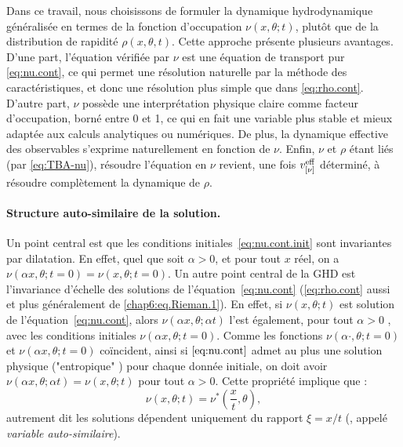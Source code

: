 Dans ce travail, nous choisissons de formuler la dynamique hydrodynamique généralisée en termes de la fonction d’occupation $\nu(x,\theta;t)$, plutôt que de la distribution de rapidité $\rho(x,\theta,t)$. Cette approche présente plusieurs avantages. D’une part, l’équation vérifiée par $\nu$ est une équation de transport pur \eqref{eq:nu.cont}, ce qui permet une résolution naturelle par la méthode des caractéristiques, et donc une résolution plus simple que dans \eqref{eq:rho.cont}. D’autre part, $\nu$ possède une interprétation physique claire comme facteur d'occupation, borné entre 0 et 1, ce qui en fait une variable plus stable et mieux adaptée aux calculs analytiques ou numériques.
De plus, la dynamique effective des observables s’exprime naturellement en fonction de $\nu$.
Enfin, $\nu$ et $\rho$ étant liés (par \eqref{eq:TBA-nu}), résoudre l’équation en $\nu$ revient, une fois $v^{\rm eff}_{[\nu]}$ déterminé, à résoudre complètement la dynamique de $\rho$.


\paragraph{Structure auto-similaire de la solution.}
Un point central est que les conditions initiales~\eqref{eq:nu.cont.init} sont invariantes par dilatation. En effet, quel que soit $\alpha >0$, et pour tout $x$ réel, on a $\nu(\alpha x , \theta ; t = 0 ) = \nu( x , \theta ; t = 0 ) $.
Un autre point central de la \gls{GHD} est l’invariance d’échelle des solutions de l’équation~\eqref{eq:nu.cont} (\eqref{eq:rho.cont} aussi et plus généralement de \eqref{chap6:eq.Rieman.1}). En effet, si $\nu(x,\theta;t)$ est solution de  l’équation~\eqref{eq:nu.cont}, alors $\nu(\alpha x, \theta; \alpha t)$ l’est également,  pour tout $\alpha > 0$ , avec les conditions initiales $\nu(\alpha x , \theta ; t = 0 )$. Comme les fonctions $\nu(\alpha \cdot , \theta ; t = 0 )$ et $\nu( \alpha x , \theta ; t = 0 )$ coïncident, ainsi si $\eqref{eq:nu.cont}$ admet au plus une solution physique ("entropique" \cite{coulombel:cel-00616496}) pour chaque donnée initiale, on doit avoir $\nu( \alpha x , \theta ; \alpha t ) = \nu(  x , \theta ;  t )$ pour tout $\alpha > 0 $. Cette propriété implique que :
\begin{equation}
    \nu(x,\theta;t) = \nu^*\left(\frac{x}{t},\theta\right),
    \label{eq:nuvsnuetoile}
\end{equation}
autrement dit les solutions dépendent uniquement du rapport $\xi = x/t$ (, appelé \emph{variable auto-similaire}). 


